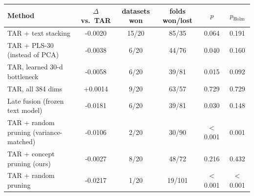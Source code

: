 \begin{tabular}{lccccc}
\toprule
Method & $\Delta$ vs.\ TAR & datasets won & folds won/lost & $p$ & $p_{\text{Holm}}$ \\
\midrule
TAR + text stacking & -0.0020 & 15/20 & 85/35 & 0.064 & 0.191 \\
TAR + PLS-30 (instead of PCA) & -0.0038 & 6/20 & 44/76 & 0.040 & 0.160 \\
TAR, learned 30-d bottleneck & -0.0058 & 6/20 & 39/81 & 0.015 & 0.092 \\
TAR, all 384 dims & +0.0014 & 9/20 & 63/57 & 0.729 & 0.729 \\
Late fusion (frozen text model) & -0.0181 & 6/20 & 39/81 & 0.030 & 0.148 \\
TAR + random pruning (variance-matched) & -0.0106 & 2/20 & 30/90 & $<$0.001 & 0.001 \\
TAR + concept pruning (ours) & -0.0027 & 8/20 & 48/72 & 0.216 & 0.432 \\
TAR + random pruning & -0.0217 & 1/20 & 19/101 & $<$0.001 & $<$0.001 \\
\bottomrule
\end{tabular}
